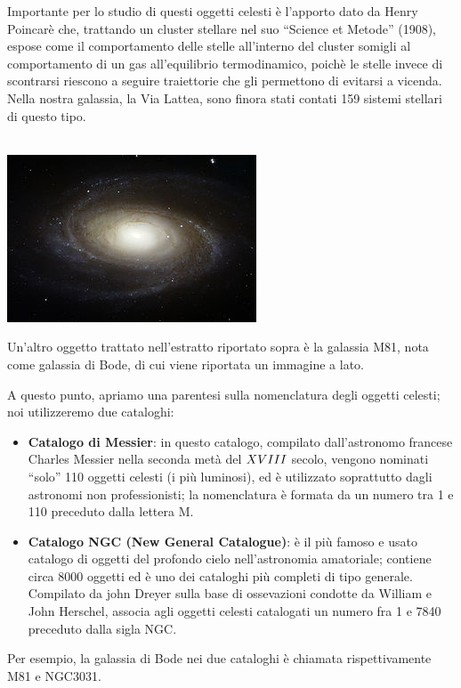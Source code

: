 Importante per lo studio di questi oggetti celesti è l'apporto dato da Henry Poincarè che, trattando un cluster stellare nel suo ``Science et Metode'' (1908), espose come il comportamento delle stelle all'interno del cluster somigli al comportamento di un gas all'equilibrio termodinamico, poichè le stelle invece di scontrarsi riescono a seguire traiettorie che gli permettono di evitarsi a vicenda. Nella nostra galassia, la Via Lattea, sono finora stati contati 159 sistemi stellari di questo tipo.\\
\\
\begin{minipage}{.40\textwidth}
	\centering
	\includegraphics[width=.70\textwidth]{Img/M81_bis.jpg}
\end{minipage}
\begin{minipage}{.50\textwidth}
	Un'altro oggetto trattato nell'estratto riportato sopra è la galassia M81, nota come galassia di Bode, di cui viene riportata un immagine a lato.
\end{minipage}

\vspace{0.5cm}

A questo punto, apriamo una parentesi sulla nomenclatura degli oggetti celesti; noi utilizzeremo due cataloghi:
\begin{itemize}
	\item \textbf{Catalogo di Messier}: in questo catalogo, compilato dall'astronomo francese Charles Messier nella seconda metà del $\RNum{18}$ secolo, vengono nominati ``solo'' 110 oggetti celesti (i più luminosi), ed è utilizzato soprattutto dagli astronomi non professionisti; la nomenclatura è formata da un numero tra 1 e 110 preceduto dalla lettera M.
	\item \textbf{Catalogo NGC (New General Catalogue)}: è il più famoso e usato catalogo di oggetti del profondo cielo nell'astronomia amatoriale; contiene circa 8000 oggetti ed è uno dei cataloghi più completi di tipo generale. Compilato da john Dreyer sulla base di ossevazioni condotte da William e John Herschel, associa agli oggetti celesti catalogati un numero fra 1 e 7840 preceduto dalla sigla NGC.
\end{itemize}
Per esempio, la galassia di Bode nei due cataloghi è chiamata rispettivamente M81 e NGC3031.


